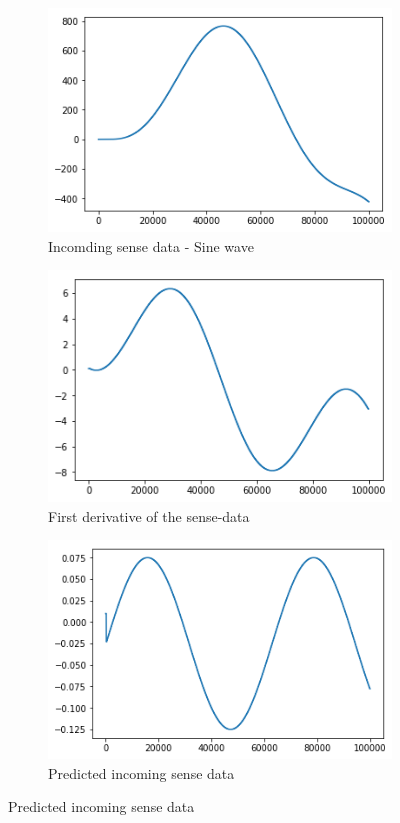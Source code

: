 \begin{figure}[H]
\centering
\begin{subfigure}{.3\linewidth}
 \centering
 \includegraphics[scale=0.35]{chapter_3_figures/fc_phi.png}
 \caption{Incomding sense data - Sine wave}
\end{subfigure}
 \hfill
\begin{subfigure}{.3\linewidth}
 \centering
 \includegraphics[scale=0.35]{chapter_3_figures/fc_phidot.png}
 \caption{First derivative of the sense-data}
\end{subfigure}
\hfill
\begin{subfigure}{.3\linewidth}
 \centering
 \includegraphics[scale=0.35]{chapter_3_figures/fc_phidotdot.png}
 \caption{Predicted incoming sense data}
\end{subfigure}
\bigskip


\end{figure}
